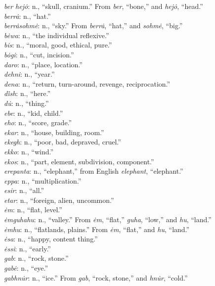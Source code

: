 \documentclass{article}[10pt]
\begin{document}
\begin{multicols}{3}
\emph{ber hej\.{o}}: n., ``skull, cranium.'' From \emph{ber}, ``bone,'' and \emph{hej\.{o}}, ``head.''\\
\emph{berr\.{a}}: n., ``hat.''\\
\emph{berr\.{a}sohm\.{e}}: n., ``sky.'' From \emph{berr\.{a}}, ``hat,'' and \emph{sohm\.{e}}, ``big.''\\
\emph{b\.{e}wa}: n., ``the individual reflexive.''\\
\emph{bis}: n., ``moral, good, ethical, pure.''\\
\emph{b\.{o}gi}: n., ``cut, incision.''\\
\emph{daro}: n., ``place, location.''\\
\emph{dehni}: n., ``year.''\\
\emph{dena}: n., ``return, turn-around, revenge, reciprocation.''\\
\emph{d\.{i}sh}: n., ``here.''\\
\emph{d\.{u}}: n., ``thing.''\\
\emph{ebe}: n., ``kid, child.''\\
\emph{eho}: n., ``score, grade.''\\
\emph{ekar}: n., ``house, building, room.''\\
\emph{ekegh}: n., ``poor, bad, depraved, cruel.''\\
\emph{ekko}: n., ``wind.''\\
\emph{ekos}: n., ``part, element, subdivision, component.''\\
\emph{erepanta}: n., ``elephant,'' from English \emph{elephant}, ``elephant.''\\
\emph{eppa}: n., ``multiplication.''\\
\emph{esir}: n., ``all.''\\
\emph{etar}: n., ``foreign, alien, uncommon.''\\
\emph{\.{e}m}: n., ``flat, level.''\\
\emph{\.{e}mguhahu}: n., ``valley.'' From \emph{\.{e}m}, ``flat,'' \emph{guha}, ``low,'' and \emph{hu}, ``land.''\\
\emph{\.{e}mhu}: n., ``flatlands, plains.'' From \emph{\.{e}m}, ``flat,'' and \emph{hu}, ``land.''\\
\emph{\.{e}sa}: n., ``happy, content thing.''\\
\emph{\.{e}ssi}: n., ``early.''\\
\emph{gab}: n., ``rock, stone.''\\
\emph{gab\.{e}}: n., ``eye.''\\
\emph{gabhn\.{u}r}: n., ``ice.'' From \emph{gab}, ``rock, stone,'' and \emph{hn\.{u}r}, ``cold.''\\

\end{multicols}
\end{document}
